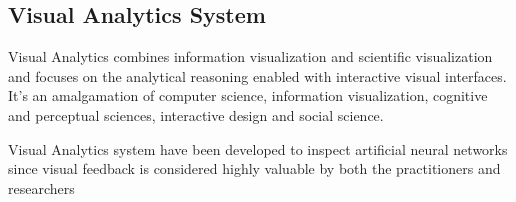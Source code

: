 \subsection{Visual Analytics System}
    
Visual Analytics combines information visualization and scientific visualization and focuses on the analytical reasoning enabled with interactive visual interfaces. It’s an amalgamation of computer science, information visualization, cognitive and perceptual sciences, interactive design and social science.

Visual Analytics system have been developed to inspect artificial neural networks since visual feedback is considered highly valuable by both the practitioners and researchers


